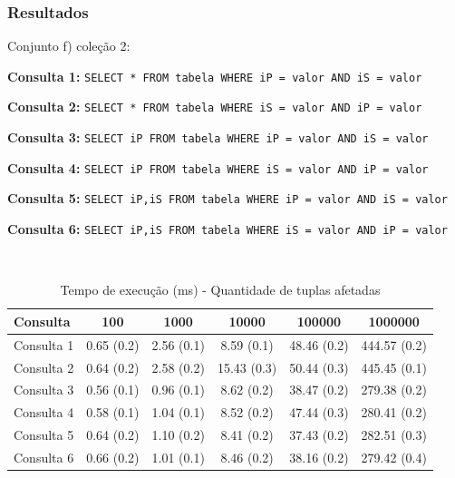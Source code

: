 \documentclass[10pt]{beamer}
\begin{document}
\begin{frame}[fragile]
  \frametitle{Resultados}


  \begin{itemize}
  \item Conjunto f) coleção 2:

  \footnotesize{\item \textbf{Consulta 1: } \texttt{SELECT * FROM tabela WHERE iP = valor AND iS = valor}}

  \item  \footnotesize{\textbf{Consulta 2: } \texttt{SELECT * FROM tabela WHERE iS = valor AND iP = valor}}

   \item \footnotesize{\textbf{Consulta 3: } \texttt{SELECT iP FROM tabela WHERE iP = valor AND iS = valor}}
  
   \item \footnotesize{\textbf{Consulta 4: } \texttt{SELECT iP FROM tabela WHERE iS = valor AND iP = valor}}
  
   \item \footnotesize{\textbf{Consulta 5: } \texttt{SELECT iP,iS FROM tabela WHERE iP = valor AND iS = valor}}

   \item \footnotesize{\textbf{Consulta 6: } \texttt{SELECT iP,iS FROM tabela WHERE iS = valor AND iP = valor}}

   \item[\ ] \

  \end{itemize}

\begin{adjustwidth}{-2em}{-2em}

 \begin{table}[!htb]
    \footnotesize
    \centering
    \begin{tabular}{lccccc}
      \toprule
      \textbf{Consulta} & \textbf{100}  & \textbf{1000}  & \textbf{10000} & \textbf{100000} & \textbf{1000000}  \\
      \midrule
      Consulta 1  & 0.65 (0.2)  &  2.56 (0.1)  & 8.59 (0.1)  & 48.46 (0.2) & 444.57 (0.2)  \\
      Consulta 2  & 0.64 (0.2)  &  2.58 (0.2)  & 15.43 (0.3)  & 50.44 (0.3) & 445.45 (0.1)  \\
      Consulta 3 & 0.56 (0.1)  &  0.96 (0.1) & 8.62 (0.2)  & 38.47 (0.2) & 279.38 (0.2)  \\
      Consulta 4 & 0.58 (0.1)  &  1.04 (0.1)  & 8.52 (0.2)  & 47.44 (0.3) & 280.41 (0.2)  \\
      Consulta 5 & 0.64 (0.2)  &  1.10 (0.2) & 8.41 (0.2)  & 37.43 (0.2) & 282.51 (0.3)  \\
      Consulta 6  & 0.66 (0.2)  &  1.01 (0.1) & 8.46 (0.2)  & 38.16 (0.2) & 279.42 (0.4)  \\
      \bottomrule
    \end{tabular}
    \caption{Tempo de execução (ms) - Quantidade de tuplas afetadas} 
    \end{table}

\end{adjustwidth}
\end{frame}
\end{document}
